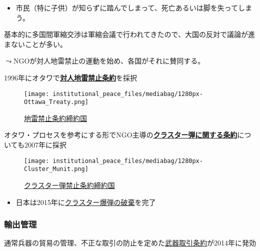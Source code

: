 \documentclass[
  xelatex,
  ja=standard]{bxjsarticle}
\providecommand{\tightlist}{%
  \setlength{\itemsep}{0pt}\setlength{\parskip}{0pt}}\usepackage{longtable,booktabs,array}
\begin{document}
\begin{itemize}
\tightlist
\item
  市民（特に子供）が知らずに踏んでしまって、死亡あるいは脚を失ってしまう。
\end{itemize}

基本的に多国間軍縮交渉は軍縮会議で行われてきたので、大国の反対で議論が進まないことが多い。

\(\leadsto\)NGOが対人地雷禁止の運動を始め、各国がそれに賛同する。

1996年にオタワで\href{https://www.mofa.go.jp/mofaj/gaiko/arms/mine/genjo.html}{\textbf{対人地雷禁止条約}}を採択

\begin{figure}[htpb]

{\centering \texttt{[image: institutional\_peace\_files/mediabag/1280px-Ottawa\_Treaty.png]}

}

\caption{\href{https://commons.wikimedia.org/wiki/File:Ottawa_Treaty_members.svg}{地雷禁止条約締約国}}

\end{figure}

オタワ・プロセスを参考にする形でNGO主導の\href{https://www.mofa.go.jp/mofaj/gaiko/treaty/shomei_37.html}{\textbf{クラスター弾に関する条約}}についても2007年に採択

\begin{figure}[htpb]

{\centering \texttt{[image: institutional\_peace\_files/mediabag/1280px-Cluster\_Munit.png]}

}

\caption{\href{https://commons.wikimedia.org/wiki/File:Cluster_Munitions_Convention.svg}{クラスター弾禁止条約締約国}}

\end{figure}

\begin{itemize}
\tightlist
\item
  日本は2015年に\href{https://www.mofa.go.jp/mofaj/press/release/press4_001772.html}{クラスター爆弾の破棄}を完了
\end{itemize}

\hypertarget{ux8f38ux51faux7ba1ux7406}{%
\subsubsection{輸出管理}\label{ux8f38ux51faux7ba1ux7406}}

通常兵器の貿易の管理、不正な取引の防止を定めた\href{https://www.mofa.go.jp/mofaj/dns/ca/page22_002843.html}{武器取引条約}が2014年に発効
\end{document}
